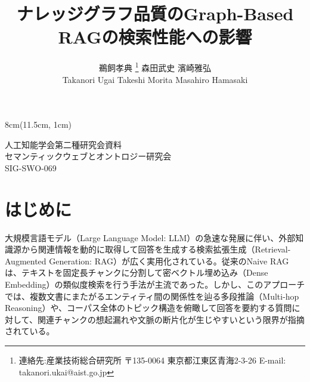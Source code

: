 \documentclass[a4j,dvipdfmx]{jsarticle}
\begin{document}
\begin{textblock*}{8cm}(11.5cm, 1cm) %
\begin{flushright}
   人工知能学会第二種研究会資料 \\
   セマンティックウェブとオントロジー研究会 \\
   SIG-SWO-069
   \end{flushright}
\end{textblock*}

\title{ナレッジグラフ品質のGraph-Based RAGの検索性能への影響}


\author{鵜飼孝典
\thanks{連絡先:産業技術総合研究所\newline%
〒135-0064 東京都江東区青海2-3-26\newline%
E-mail: takanori.ukai@aist.go.jp} \quad
森田武史 \quad
濱崎雅弘\\
    Takanori Ugai \quad
	Takeshi Morita \quad
    Masahiro Hamasaki
	}



\pagestyle{plain}
\maketitle

\section{はじめに}

大規模言語モデル（Large Language Model: LLM）の急速な発展に伴い、外部知識源から関連情報を動的に取得して回答を生成する検索拡張生成（Retrieval-Augmented Generation: RAG）\cite{lewis2020rag}が広く実用化されている。従来のNaive RAGは、テキストを固定長チャンクに分割して密ベクトル埋め込み（Dense Embedding）の類似度検索を行う手法が主流であった。しかし、このアプローチでは、複数文書にまたがるエンティティ間の関係性を辿る多段推論（Multi-hop Reasoning）や、コーパス全体のトピック構造を俯瞰して回答を要約する質問に対して、関連チャンクの想起漏れや文脈の断片化が生じやすいという限界が指摘されている。
\end{document}
